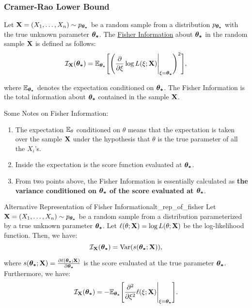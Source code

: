 \subsubsection{Cramer-Rao Lower Bound}
\begin{definition}
    Let ${\bf X}=(X_1, \dots, X_n) \sim p_{\boldsymbol{\theta_*}}$ be a random sample from a distribution $p_{\boldsymbol{\theta_*}}$ with the true unknown parameter $\boldsymbol{\theta_*}$. The \underline{Fisher Information} about $\boldsymbol{\theta_*}$ in the random sample ${\bf X}$ is defined as follows:
    \begin{equation}
        \mathcal{I}_{\bf X}(\boldsymbol{\theta_*}) = \mathbb{E}_{\boldsymbol{\theta_*}}\Bigg[ 
            \Bigg( 
                \frac{\partial}{\partial\xi}\log L(\xi;{\bf X})\Bigg|_{\xi=\boldsymbol{\theta_*}}
             \Bigg)^2
         \Bigg],
    \end{equation}

    \noindent where $\mathbb{E}_{\boldsymbol{\theta_*}}$ denotes the expectation conditioned on $\boldsymbol{\theta_*}$. The Fisher Information is the total information about $\boldsymbol{\theta_*}$ contained in the sample ${\bf X}$.
\end{definition}

\begin{remark}
    Some Notes on Fisher Information:
    \begin{enumerate}
        \item The expectation $\mathbb{E}_\theta$ conditioned on $\theta$ means that the expectation is taken over the sample ${\bf X}$ under the hypothesis that $\theta$ is the true parameter of all the $X_i$'s. 

        \item Inside the expectation is the score function evaluated at $\boldsymbol{\theta_*}$.
        \item From two points above, the Fisher Information is essentially calculated as \textbf{the variance conditioned on $\boldsymbol{\theta_*}$ of the score evaluated at $\boldsymbol{\theta_*}$}.
    \end{enumerate} 
\end{remark} 

\begin{proposition}{Alternative Representation of Fisher Information}{alt_rep_of_fisher}
    Let ${\bf X}=(X_1, \dots, X_n) \sim p_{\boldsymbol{\theta_*}}$ be a random sample from a distribution parameterized by a true unknown parameter $\boldsymbol{\theta_*}$. Let $\ell(\theta;{\bf X})=\log L(\theta;{\bf X})$ be the log-likelihood function. Then, we have:
    \begin{equation}
        \mathcal{I}_{{\bf X}}(\boldsymbol{\theta_*}) = \mathrm{Var}(s(\boldsymbol{\theta_*};{\bf X})), 
    \end{equation} 

    \noindent where $s(\boldsymbol{\theta_*};{\bf X})=\frac{\partial\ell(\boldsymbol{\theta_*};{\bf X})}{\partial\boldsymbol{\theta_*}}$ is the score evaluated at the true parameter $\boldsymbol{\theta_*}$. Furthermore, we have:
    \begin{equation}
        \mathcal{I}_{{\bf X}}(\boldsymbol{\theta_*}) = -\mathbb{E}_{\boldsymbol{\theta_*}}\Bigg[ \frac{\partial^2}{\partial\xi^2}\ell(\xi;{\bf X})\Bigg|_{\xi=\boldsymbol{\theta_*}} \Bigg].
    \end{equation} 
\end{proposition} 

